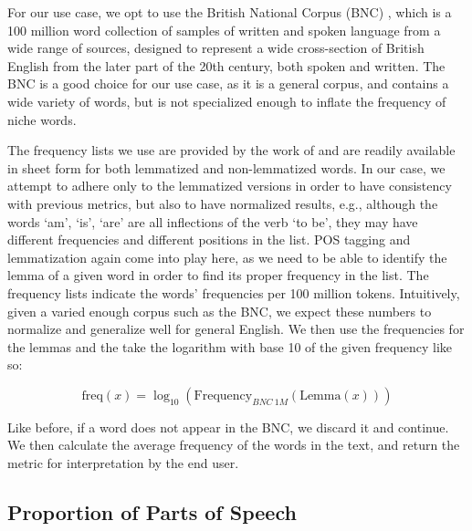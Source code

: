 For our use case, we opt to use the British National Corpus (BNC) \citep{bnc-20.500.14106/2554}, which is a 100 million word collection of samples of written and spoken language from a wide range of sources, designed to represent a wide cross-section of British English from the later part of the 20th century, both spoken and written. The BNC is a good choice for our use case, as it is a general corpus, and contains a wide variety of words, but is not specialized enough to inflate the frequency of niche words. 

The frequency lists we use are provided by the work of \cite{leech_rayson_wilson_2014} and are readily available in sheet form for both lemmatized and non-lemmatized words. In our case, we attempt to adhere only to the lemmatized versions in order to have consistency with previous metrics, but also to have normalized results, e.g., although the words `am', `is', `are' are all inflections of the verb `to be', they may have different frequencies and different positions in the list. POS tagging and lemmatization again come into play here, as we need to be able to identify the lemma of a given word in order to find its proper frequency in the list. The frequency lists indicate the words' frequencies per 100 million tokens. Intuitively, given a varied enough corpus such as the BNC, we expect these numbers to normalize and generalize well for general English. We then use the frequencies for the lemmas and the take the logarithm with base 10 of the given frequency like so:

\begin{equation}
    \label{eq:frequency}
    \text{freq}(x) = \log_{10}(\text{Frequency}_{BNC\ 1M}(\text{Lemma}(x)))
\end{equation}

Like before, if a word does not appear in the BNC, we discard it and continue. We then calculate the average frequency of the words in the text, and return the metric for interpretation by the end user.

\subsection{Proportion of Parts of Speech}
\label{pos_prop}
